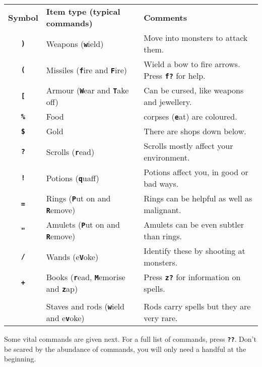 \documentclass[a4paper,10pt]{article}
\newcommand{\key}[1]{{{\texttt{\textbf{#1}}}}} %
\newcommand{\sex}[1]{{{\textbf{#1}}}} %
\newcommand{\para}{\vspace{1.5ex}}
\begin{document}
\begin{tabular}{cll}
\sex{Symbol} & \sex{Item type (typical commands)} & \sex{Comments} \\
\key{)}  & Weapons (\key{w}ield)                  & Move into monsters to attack them.\\
\key{(}  & Missiles (\key{f}ire and \key{F}ire)   & Wield a bow to fire arrows. Press \key{f?} for help.\\ 
\key{[}  & Armour (\key{W}ear and \key{T}ake off) & Can be cursed, like weapons and jewellery. \\
\key{\%} & Food & corpses (\key{e}at) are coloured. \\
\key{\$} & Gold                                   & There are shops down below. \\
\key{?}  & Scrolls (\key{r}ead)                   & Scrolls mostly affect your environment.\\
\key{!}  & Potions (\key{q}uaff)                  & Potions affect you, in good or bad ways. \\
\key{=}  & Rings (\key{P}ut on and \key{R}emove)  & Rings can be helpful as well as malignant. \\
\key{"}  & Amulets (\key{P}ut on and \key{R}emove) & Amulets can be even subtler than rings. \\
\key{/}  & Wands (e\key{V}oke)                    & Identify these by shooting at monsters. \\
\key{+}  & Books (\key{r}ead, \key{M}emorise and \key{z}ap) & Press \key{z?} for information on spells.\\
\key{\char`\\} & Staves and rods (\key{w}ield and e\key{v}oke) \hspace{0.2em}
                                                  & Rods carry spells but they are very rare.
\end{tabular}

\para

Some vital commands are given next. For a full list of commands, press \key{??}.
Don't be scared by the abundance of commands, you will only need a handful at 
the beginning. 

\para
\end{document}

